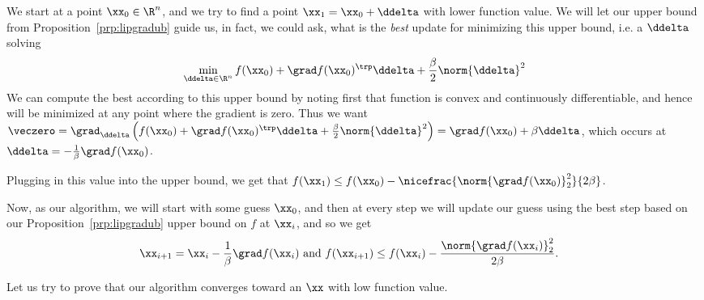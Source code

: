 We start at a point $\xx_0 \in \R^n$, and we try to find a
point $\xx_1 = \xx_0 +\ddelta$ with lower function value.
We will let our upper bound from Proposition~\ref{prp:lipgradub} guide
us, in fact, we could ask, what is the \emph{best} update for
minimizing this upper bound, i.e. a $\ddelta$ solving
\[
  \min_{\ddelta \in \R^n}
  f(\xx_{0})
     + \grad f(\xx_{0})^\trp\ddelta
      + \frac{\beta}{2} \norm{\ddelta}^2
\]
We can compute the best according to this upper bound by noting
first that function is convex and continuously differentiable,
and hence will be minimized at any point where the gradient is zero.
Thus we want
$\veczero = \grad_{\ddelta} \left(
 f(\xx_{0})
     + \grad f(\xx_{0})^\trp\ddelta
     + \frac{\beta}{2} \norm{\ddelta}^2
\right)
=
\grad f(\xx_{0})
+
\beta \ddelta
$, which occurs at
$\ddelta = -\frac{1}{\beta}\grad f(\xx_{0})$.

Plugging in this value into the upper bound, we get that
$f(\xx_1) \leq f(\xx_0) - \nicefrac{\norm{\grad f(\xx_{0})}_2^2}{2\beta}$.

Now, as our algorithm, we will start with some guess $\xx_0$, and then
at every step we will update our guess using the best step based on
our Proposition~\ref{prp:lipgradub} upper bound on $f$ at $\xx_i$, and so we get
\begin{align}
\label{eq:gdstep}
  \xx_{i+1} = \xx_{i}-\frac{1}{\beta}\grad f(\xx_{i})
  \text{ and }
    f(\xx_{i+1}) &\leq f(\xx_{i}) - \frac{\norm{\grad
                 f(\xx_{i})}_2^2}{2\beta}
  .
\end{align}


Let us try to prove that our algorithm converges toward an $\xx$ with low
function value.

